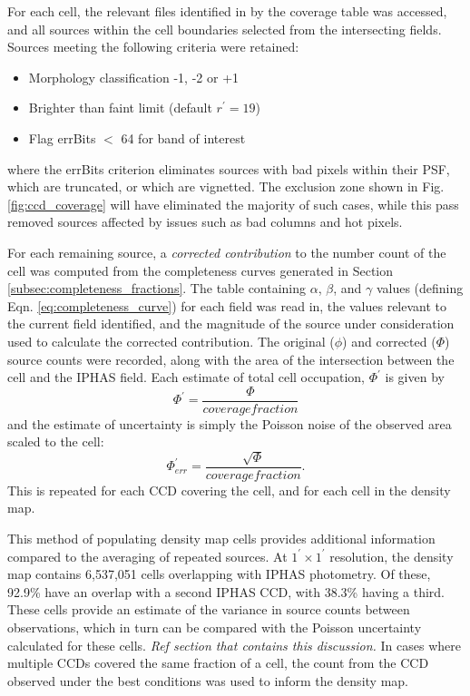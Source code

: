 \documentclass[a4paper,useAMS,usenatbib]{mn2e}
\begin{document}
For each cell, the relevant files identified in by the coverage table was accessed, and all sources within the cell boundaries selected from the intersecting fields. Sources meeting the following criteria were retained:
\begin{itemize} \itemsep
\item Morphology classification -1, -2 or +1
\item Brighter than faint limit (default $r^{\prime}=19$)
\item Flag errBits $<$ 64 for band of interest
\end{itemize}
\noindent where the errBits criterion eliminates sources with bad pixels within their PSF, which are truncated, or which are vignetted. The exclusion zone shown in Fig. \ref{fig:ccd_coverage} will have eliminated the majority of such cases, while this pass removed sources affected by issues such as bad columns and hot pixels.

For each remaining source, a \textit{corrected contribution} to the number count of the cell was computed from the completeness curves generated in Section \ref{subsec:completeness_fractions}. The table containing $\alpha$, $\beta$, and $\gamma$ values (defining Eqn. \ref{eq:completeness_curve}) for each field was read in, the values relevant to the current field identified, and the magnitude of the source under consideration used to calculate the corrected contribution. The original ($\phi$) and corrected ($\Phi$) source counts were recorded, along with the area of the intersection between the cell and the IPHAS field. Each estimate of total cell occupation, $\Phi^{\prime}$ is given by 
\begin{equation}
\Phi^{\prime} = \dfrac{\Phi}{coverage fraction}
\label{eq:corrected_density}
\end{equation}
\noindent and the estimate of uncertainty is simply the Poisson noise of the observed area scaled to the cell:
\begin{equation}
\Phi^{\prime}_{err} = \dfrac{\sqrt{\Phi}}{coverage fraction}.
\label{eq:corrected_poisson}
\end{equation} 
\noindent This is repeated for each CCD covering the cell, and for each cell in the density map.

This method of populating density map cells provides additional information compared to the averaging of repeated sources. At $1^{\prime}\times1^{\prime}$ resolution, the density map contains 6,537,051 cells overlapping with IPHAS photometry. Of these, 92.9\% have an overlap with a second IPHAS CCD, with 38.3\% having a third. These cells provide an estimate of the variance in source counts between observations, which in turn can be compared with the Poisson uncertainty calculated for these cells. \textit{Ref section that contains this discussion.} In cases where multiple CCDs covered the same fraction of a cell, the count from the CCD observed under the best conditions was used to inform the density map.
\end{document}
